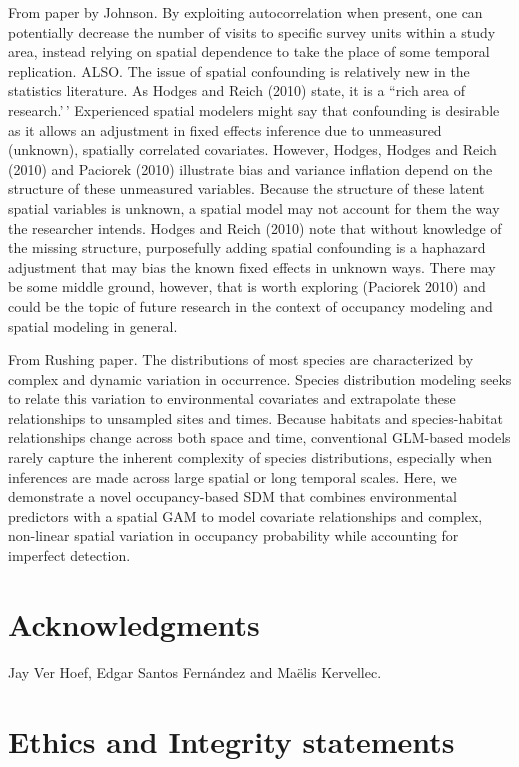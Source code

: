 \documentclass[
  11pt,
  a4paper,
]{article}
\begin{document}
From paper by Johnson. By exploiting autocorrelation when present, one can potentially decrease the number of visits to specific survey units
within a study area, instead relying on spatial dependence to take the place of some temporal replication.
ALSO. The issue of spatial confounding is relatively new in
the statistics literature. As Hodges and Reich (2010)
state, it is a ``rich area of research.'\,' Experienced spatial
modelers might say that confounding is desirable as it
allows an adjustment in fixed effects inference due to
unmeasured (unknown), spatially correlated covariates.
However, Hodges, Hodges and Reich (2010) and
Paciorek (2010) illustrate bias and variance inflation
depend on the structure of these unmeasured variables.
Because the structure of these latent spatial variables is
unknown, a spatial model may not account for them the
way the researcher intends. Hodges and Reich (2010)
note that without knowledge of the missing structure,
purposefully adding spatial confounding is a haphazard
adjustment that may bias the known fixed effects in
unknown ways. There may be some middle ground,
however, that is worth exploring (Paciorek 2010) and
could be the topic of future research in the context of
occupancy modeling and spatial modeling in general.

From Rushing paper. The distributions of most species are characterized by complex and dynamic variation in occurrence. Species distribution modeling seeks to relate this variation to environmental covariates and extrapolate these relationships to unsampled sites and times. Because habitats and species-habitat relationships change across both space and time, conventional GLM-based models rarely capture the inherent complexity of species distributions, especially when inferences are made across large spatial or long temporal scales. Here, we demonstrate a novel occupancy-based SDM that combines environmental predictors with a spatial GAM to model covariate relationships and complex, non-linear spatial variation in occupancy probability while accounting for imperfect detection.

\section{Acknowledgments}\label{acknowledgments}

Jay Ver Hoef, Edgar Santos Fernández and Maëlis Kervellec.

\section{Ethics and Integrity statements}\label{ethics-and-integrity-statements}
\end{document}
